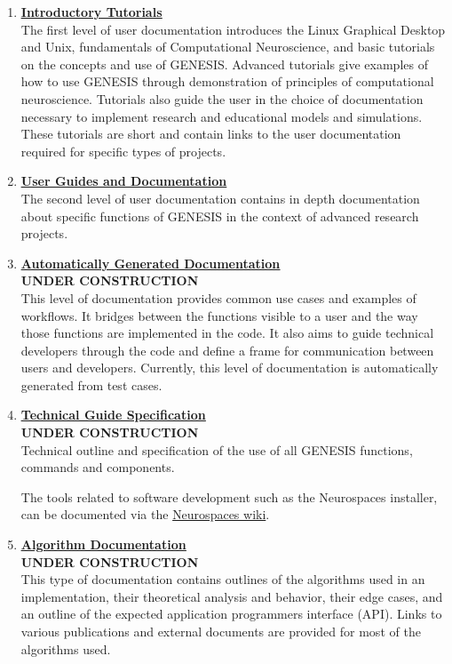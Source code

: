 \documentclass[12pt]{article}
\begin{document}
\begin{enumerate}

\item \href{../contents-level1/contents-level1.pdf}{\bf \underline{Introductory Tutorials}}\\
The first level of user documentation introduces the Linux Graphical Desktop and Unix, fundamentals of Computational Neuroscience, and basic tutorials on the concepts and use of GENESIS. Advanced tutorials give examples of how to use GENESIS through demonstration of principles of computational neuroscience. Tutorials also guide the user
  in the choice of documentation necessary to implement
  research and educational models and simulations.  These tutorials
  are short and contain links to the user documentation required for
  specific types of projects.  

\item \href{../contents-level2/contents-level2.pdf}{\bf \underline{User Guides and Documentation}}\\
The second level of user documentation contains in depth
  documentation about specific functions of GENESIS in the context of
  advanced research projects.

\item \href{../contents-level3/contents-level3.pdf}{\bf \underline{Automatically Generated Documentation}}\\
 {\bf UNDER CONSTRUCTION}\\
  This level of documentation provides common use cases and examples of workflows. It bridges between the functions visible to
  a user and the way those functions are implemented in the code.
  It also aims to guide technical developers through the code
  and define a frame for communication between users and developers.
  Currently, this level of documentation is automatically generated
  from test cases.
  
 \item \href{../contents-level4/contents-level4.pdf}{\bf \underline{Technical Guide Specification}}\\
 {\bf UNDER CONSTRUCTION}\\
  Technical outline
  and specification of the use of all GENESIS functions, commands and
  components.

  The tools related to software development such as the Neurospaces
  installer, can be documented via the \href{http://code.google.com/p/neurospaces/wiki/Index}{Neurospaces wiki}.

\item \href{../document-level5/document-level5.pdf}{\bf \underline{Algorithm Documentation}} \\
{\bf UNDER CONSTRUCTION}\\
  This type of documentation contains outlines of the
  algorithms used in an implementation, their theoretical analysis
  and behavior, their edge cases, and an outline of the expected
  application programmers interface (API).  Links to various publications
  and external documents are provided for most of the algorithms
  used.


\end{enumerate}
\end{document}
